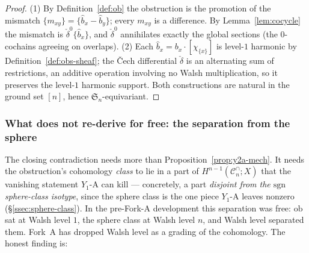 \documentclass[11pt,oneside]{amsart}
\theoremstyle{plain}
\theoremstyle{definition}
\theoremstyle{remark}
\theoremstyle{honeststyle}
\newcommand{\sgn}{\mathrm{sgn}}
\newcommand{\Sym}{\mathfrak{S}}
\newcommand{\Cn}{\mathcal{C}^{\cap}_n}
\newcommand{\ob}{\mathrm{ob}}
\newcommand{\walsh}[1]{\chi_{#1}}
\begin{document}
\begin{proof}
(1) By Definition~\ref{def:ob} the obstruction is the promotion of the
mismatch $\{m_{xy}\}=\{\widehat b_x-\widehat b_y\}$; every $m_{xy}$ is
a difference. By Lemma~\ref{lem:cocycle} the mismatch is
$\check\delta^{0}\{\widehat b_x\}$, and $\check\delta^{0}$ annihilates
exactly the global sections (the $0$-cochains agreeing on overlaps).
(2) Each $\widehat b_x=b_x\cdot[\walsh{\{x\}}]$ is level-$1$ harmonic
by Definition~\ref{def:obs-sheaf}; the \v{C}ech differential
$\check\delta$ is an alternating sum of restrictions, an additive
operation involving no Walsh multiplication, so it preserves the
level-$1$ harmonic support. Both constructions are natural in the
ground set $[n]$, hence $\Sym_n$-equivariant.
\end{proof}

\subsubsection*{What does not re-derive for free: the separation from the sphere}

The closing contradiction needs more than Proposition~\ref{prop:y2a-mech}.
It needs the obstruction's cohomology \emph{class} to lie in a part of
$H^{n-1}(\Cn;X)$ that the vanishing statement $Y_1$-A can kill ---
concretely, a part \emph{disjoint from the $\sgn$ sphere-class
isotype}, since the sphere class is the one piece $Y_1$-A leaves
nonzero (\S\ref{ssec:sphere-class}). In the pre-Fork-A development this
separation was free: $\ob$ sat at Walsh level $1$, the sphere class at
Walsh level $n$, and Walsh level separated them. Fork~A has dropped
Walsh level as a grading of the cohomology. The honest finding is:
\end{document}
